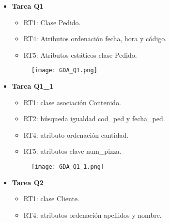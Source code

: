 \documentclass[a4paper]{article}
\begin{document}
\begin{itemize}

    \item \textbf{\large{Tarea Q1}}

    \begin{itemize}

        \item RT1: Clase Pedido.

        \item RT4: Atributos ordenación fecha, hora y código.

        \item RT5: Atributos estáticos clase Pedido.

    \end{itemize}

    \begin{figure}[H]
        \centering
        \texttt{[image: GDA\_Q1.png]}
        \label{fig:Q1}
    \end{figure}

    \item \textbf{\large{Tarea Q1\_1}}

    \begin{itemize}
    
        \item RT1: clase asociación Contenido.

        \item RT2: búsqueda igualdad cod\_ped y fecha\_ped.

        \item RT4: atributo ordenación cantidad.

        \item RT5: atributos clave num\_pizza.

    \end{itemize}

    \begin{figure}[H]
        \centering
        \texttt{[image: GDA\_Q1\_1.png]}
        \label{fig:Q1_1}
    \end{figure}

    \item \textbf{\large{Tarea Q2}}

    \begin{itemize}

        \item RT1: clase Cliente.

        \item RT4: atributos ordenación apellidos y nombre.


\end{itemize}
\end{itemize}
\end{document}

